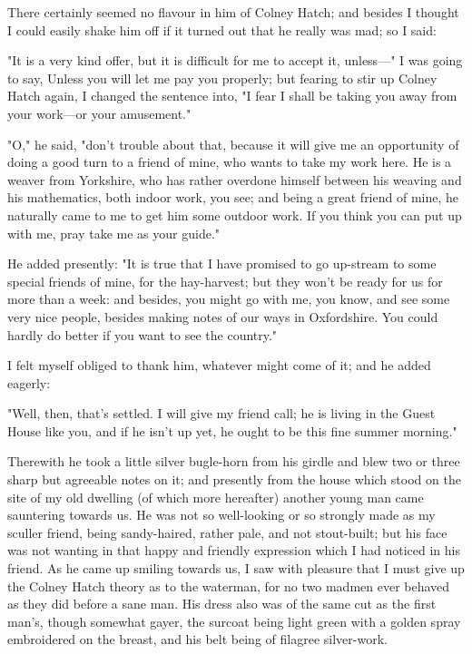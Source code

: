 There certainly seemed no flavour in him of Colney Hatch; and besides I
thought I could easily shake him off if it turned out that he really was
mad; so I said:

"It is a very kind offer, but it is difficult for me to accept it,
unless---" I was going to say, Unless you will let me pay you properly;
but fearing to stir up Colney Hatch again, I changed the sentence into,
"I fear I shall be taking you away from your work---or your amusement."

"O," he said, "don't trouble about that, because it will give me an
opportunity of doing a good turn to a friend of mine, who wants to take
my work here. He is a weaver from Yorkshire, who has rather overdone
himself between his weaving and his mathematics, both indoor work, you
see; and being a great friend of mine, he naturally came to me to get
him some outdoor work. If you think you can put up with me, pray take me
as your guide."

He added presently: "It is true that I have promised to go up-stream to
some special friends of mine, for the hay-harvest; but they won't be
ready for us for more than a week: and besides, you might go with me,
you know, and see some very nice people, besides making notes of our
ways in Oxfordshire. You could hardly do better if you want to see the
country."

I felt myself obliged to thank him, whatever might come of it; and he
added eagerly:

"Well, then, that's settled. I will give my friend call; he is living in
the Guest House like you, and if he isn't up yet, he ought to be this
fine summer morning."

Therewith he took a little silver bugle-horn from his girdle and blew
two or three sharp but agreeable notes on it; and presently from the
house which stood on the site of my old dwelling (of which more
hereafter) another young man came sauntering towards us. He was not so
well-looking or so strongly made as my sculler friend, being
sandy-haired, rather pale, and not stout-built; but his face was not
wanting in that happy and friendly expression which I had noticed in his
friend. As he came up smiling towards us, I saw with pleasure that I
must give up the Colney Hatch theory as to the waterman, for no two
madmen ever behaved as they did before a sane man. His dress also was of
the same cut as the first man's, though somewhat gayer, the surcoat
being light green with a golden spray embroidered on the breast, and his
belt being of filagree silver-work.

